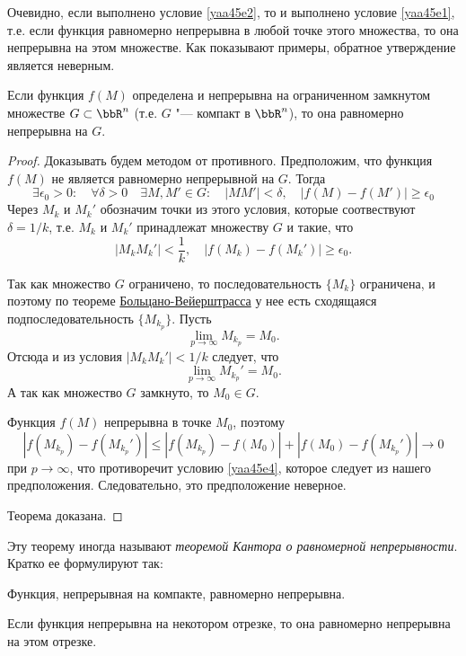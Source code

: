 Очевидно, если выполнено условие \eqref{yaa45e2}, то и выполнено условие \eqref{yaa45e1}, т.е. если функция равномерно непрерывна в любой точке этого множества, то она непрерывна на этом множестве. Как показывают примеры, обратное утверждение является неверным.

\begin{thm}
Если функция $f(M)$ определена и непрерывна на ограниченном замкнутом множестве $G\subset\bbR^n$ (т.е. $G$ "--- компакт в $\bbR^n$), то она равномерно непрерывна на $G$.
\end{thm}

\begin{proof}
Доказывать будем методом от противного. Предположим, что функция $f(M)$ не является равномерно непрерывной на $G$. Тогда
$$
\exists\epsilon_0>0:\quad\forall\delta>0\quad\exists M,M'\in G:\quad |MM'|<\delta, \quad |f(M)-f(M')|\ge \epsilon_0
$$
Через $M_k$ и $M_k'$ обозначим точки из этого условия, которые соотвествуют $\delta=1/k$, т.е. $M_k$ и $M_k'$ принадлежат множеству $G$ и такие, что 
\begin{equation}\label{yaa45e4}
|M_kM_k'|<\frac{1}{k},\quad|f(M_k)-f(M_k')|\ge \epsilon_0.
\end{equation}

Так как множество $G$ ограничено, то последовательность $\{M_k\}$ ограничена, и поэтому по теореме \hyperref[th:ch1:TBV]{Больцано-Вейерштрасса} у нее есть сходящаяся подпоследовательность $\{M_{k_p}\}$. Пусть
$$
\lim\limits_{p\to\infty} M_{k_p} =M_0.
$$
Отсюда и из условия $|M_kM_k'|<1/k$ следует, что 
$$
\lim\limits_{p\to\infty} M_{k_p}' =M_0.
$$
А так как множество $G$ замкнуто, то $M_0 \in G$.

Функция $f(M)$ непрерывна в точке $M_0$, поэтому
$$
|f(M_{k_p})-f(M_{k_p}')|\le |f(M_{k_p})-f(M_0)|+|f(M_0)-f(M_{k_p}')|\to 0
$$
при $p\to\infty$, что противоречит условию \eqref{yaa45e4}, которое следует из нашего предположения. Следовательно, это предположение неверное. 

Теорема доказана.
\end{proof}

Эту теорему иногда называют \textit{теоремой Кантора о равномерной непрерывности}. Кратко ее формулируют так:

\begin{thmn}
Функция, непрерывная на компакте, равномерно непрерывна.
\end{thmn}

\begin{cons}
Если функция непрерывна на некотором отрезке, то она равномерно непрерывна на этом отрезке. 
\end{cons}















